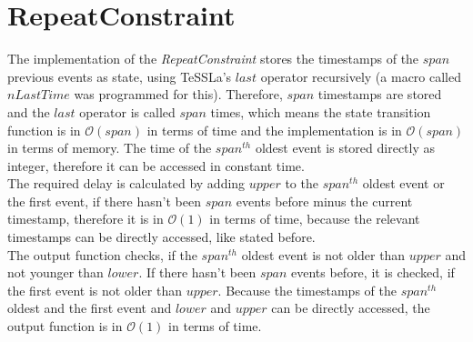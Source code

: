\section{RepeatConstraint}
	The implementation of the \emph{RepeatConstraint} stores the timestamps of the $span$ previous events as state, using TeSSLa's $last$ operator recursively (a macro called $nLastTime$ was programmed for this). Therefore, $span$ timestamps are stored and the $last$ operator is called $span$ times, which means the state transition function is in $\mathcal{O}(span)$ in terms of time and the implementation is in $\mathcal{O}(span)$ in terms of memory. The time of the $span^{th}$ oldest event is stored directly as integer, therefore it can be accessed in constant time.\\
	The required delay is calculated by adding $upper$ to the  $span^{th}$ oldest event or the first event, if there hasn't been $span$ events before minus the current timestamp, therefore it is in $\mathcal{O}(1)$ in terms of time, because the relevant timestamps can be directly accessed, like stated before.\\
	The output function checks, if the $span^{th}$ oldest event is not older than $upper$ and not younger than $lower$. If there hasn't been $span$ events before, it is checked, if the first event is not older than $upper$. Because the timestamps of the $span^{th}$ oldest and the first event and $lower$ and $upper$ can be directly accessed, the output function is in $\mathcal{O}(1)$ in terms of time.
	
